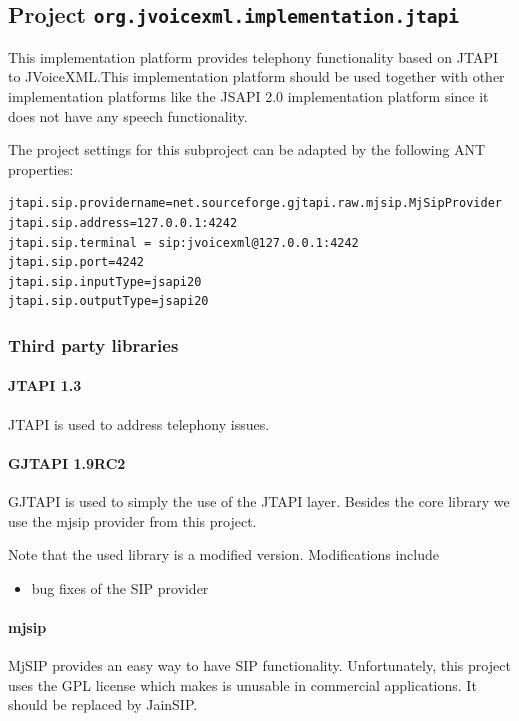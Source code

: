 \documentclass[11pt,a4paper]{article}
\begin{document}
\subsection{Project \texttt{org.jvoicexml.implementation.jtapi}}

This implementation platform provides telephony functionality based on JTAPI to
JVoiceXML.This implementation platform should be used together with other
implementation platforms like the JSAPI 2.0 implementation platform since it
does not have any speech functionality.

The project settings for this subproject can be adapted by the following ANT
properties:
\begin{lstlisting}
jtapi.sip.providername=net.sourceforge.gjtapi.raw.mjsip.MjSipProvider
jtapi.sip.address=127.0.0.1:4242
jtapi.sip.terminal = sip:jvoicexml@127.0.0.1:4242
jtapi.sip.port=4242
jtapi.sip.inputType=jsapi20
jtapi.sip.outputType=jsapi20
\end{lstlisting}

\subsubsection{Third party libraries}
\label{sec:jtapi-third-party-libr}

\paragraph{JTAPI 1.3}

JTAPI is used to address telephony issues.

\paragraph{GJTAPI 1.9RC2}

GJTAPI is used to simply the use of the JTAPI layer. Besides the core library
we use the mjsip provider from this project.

Note that the used library is a modified version. Modifications include
\begin{itemize}
\item bug fixes of the SIP provider
\end{itemize}

\paragraph{mjsip}

MjSIP provides an easy way to have SIP functionality. Unfortunately, this
project uses the GPL license which makes is unusable in commercial
applications. It should be replaced by JainSIP.
\end{document}
